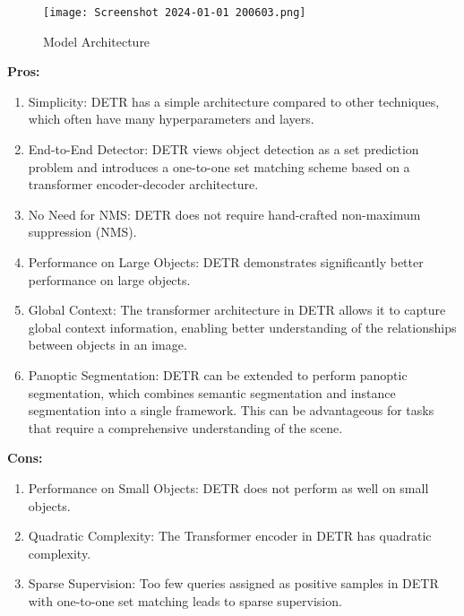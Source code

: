 \documentclass{article}
\begin{document}
\begin{figure}[H]
  \centering
  \texttt{[image: Screenshot 2024-01-01 200603.png]} %
  \caption{Model Architecture}
  \label{fig:example}
\end{figure}

\textbf{Pros:}

\begin{enumerate}
    \item Simplicity: DETR has a simple architecture compared to other techniques, which often have many hyperparameters and layers.
    
    \item End-to-End Detector: DETR views object detection as a set prediction problem and introduces a one-to-one set matching scheme based on a transformer encoder-decoder architecture.
    
    \item No Need for NMS: DETR does not require hand-crafted non-maximum suppression (NMS).
    
    \item Performance on Large Objects: DETR demonstrates significantly better performance on large objects.
    
    \item Global Context: The transformer architecture in DETR allows it to capture global context information, enabling better understanding of the relationships between objects in an image.
    
    \item Panoptic Segmentation: DETR can be extended to perform panoptic segmentation, which combines semantic segmentation and instance segmentation into a single framework. This can be advantageous for tasks that require a comprehensive understanding of the scene.
\end{enumerate}

\textbf{Cons:}

\begin{enumerate}
    \item Performance on Small Objects: DETR does not perform as well on small objects.
    
    \item Quadratic Complexity: The Transformer encoder in DETR has quadratic complexity.
    
    \item Sparse Supervision: Too few queries assigned as positive samples in DETR with one-to-one set matching leads to sparse supervision.
\end{enumerate}
\end{document}
